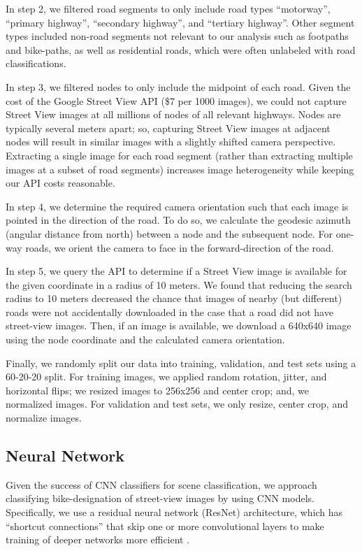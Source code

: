 \documentclass[10pt,twocolumn,letterpaper]{article}
\begin{document}
In step 2, we filtered road segments to only include road types ``motorway'', ``primary highway'', ``secondary highway'', and ``tertiary highway''. Other segment types included non-road segments not relevant to our analysis such as footpaths and bike-paths, as well as residential roads, which were often unlabeled with road classifications.

In step 3, we filtered nodes to only include the midpoint of each road. Given the cost of the Google Street View API (\$7 per 1000 images), we could not capture Street View images at all millions of nodes of all relevant highways. Nodes are typically several meters apart; so, capturing Street View images at adjacent nodes will result in similar images with a slightly shifted camera perspective. Extracting a single image for each road segment (rather than extracting multiple images at a subset of road segments) increases image heterogeneity while keeping our API costs reasonable.

In step 4, we determine the required camera orientation such that each image is pointed in the direction of the road. To do so, we calculate the geodesic azimuth (angular distance from north) between a node and the subsequent node. For one-way roads, we orient the camera to face in the forward-direction of the road.

In step 5, we query the API to determine if a Street View image is available for the given coordinate in a radius of 10 meters. We found that reducing the search radius to 10 meters decreased the chance that images of nearby (but different) roads were not accidentally downloaded in the case that a road did not have street-view images. Then, if an image is available, we download a 640x640 image using the node coordinate and the calculated camera orientation.

Finally, we randomly split our data into training, validation, and test sets using a 60-20-20 split. For training images, we applied random rotation, jitter, and horizontal flips; we resized images to 256x256 and center crop; and, we normalized images. For validation and test sets, we only resize, center crop, and normalize images.

\subsection{Neural Network}
Given the success of CNN classifiers for scene classification, we approach classifying bike-designation of street-view images by using CNN models. Specifically, we use a residual neural network (ResNet) architecture, which has ``shortcut connections'' that skip one or more convolutional layers to make training of deeper networks more efficient \cite{DBLP:journals/corr/HeZRS15}.
\end{document}
